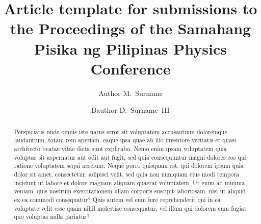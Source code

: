 \documentclass[10pt,a4paper,twoside]{article}
\begin{document}
\title{\TitleFont Article template for submissions to the Proceedings of the Samahang Pisika ng Pilipinas Physics Conference}


\author[*\negthickspace]{Author M.~Surname}
\author[ ]{Bauthor D.~Surname~III
\lastauthorsep}





\begin{abstract}
\noindent
Perspiciatis unde omnis iste natus error sit voluptatem accusantium doloremque laudantium, totam rem aperiam, eaque ipsa quae ab illo inventore veritatis et quasi architecto beatae vitae dicta sunt explicabo. Nemo enim ipsam voluptatem quia voluptas sit aspernatur aut odit aut fugit, sed quia consequuntur magni dolores eos qui ratione voluptatem sequi nesciunt. Neque porro quisquam est, qui dolorem ipsum quia dolor sit amet, consectetur, adipisci velit, sed quia non numquam eius modi tempora incidunt ut labore et dolore magnam aliquam quaerat voluptatem. Ut enim ad minima veniam, quis nostrum exercitationem ullam corporis suscipit laboriosam, nisi ut aliquid ex ea commodi consequatur? Quis autem vel eum iure reprehenderit qui in ea voluptate velit esse quam nihil molestiae consequatur, vel illum qui dolorem eum fugiat quo voluptas nulla pariatur?


\end{abstract}
\end{document}
